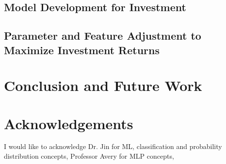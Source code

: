 \documentclass[twocolumn,12pt]{article}
\begin{document}
\begin{multicols}{2}
\begin{flushleft}
	\subsection{Model Development for Investment} \label{investment_model_dev}
	
	\subsection{Parameter and Feature Adjustment to Maximize Investment Returns} \label{adjustment_models}
	
	
	
	\section{Conclusion and Future Work} \label{conclusion}
		
	
	\section{Acknowledgements} \label{acknowledgements}
	I would like to acknowledge Dr. Jin \cite{rjin} for ML, classification and probability distribution concepts, Professor Avery \cite{avery} for MLP concepts, 




\end{flushleft}
\end{multicols}
\end{document}
